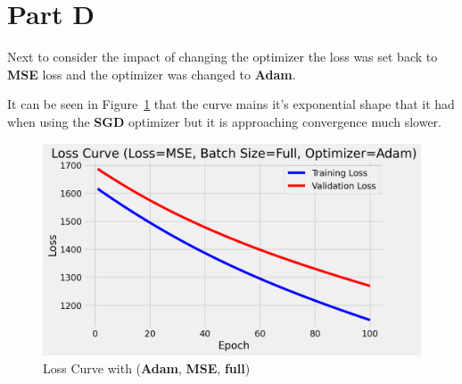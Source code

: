 \newpage
\section{Part D}
\label{sec:sec_d}
Next to consider the impact of changing the optimizer the loss was set back to \textbf{MSE} loss and the optimizer was changed to \textbf{Adam}. 


It can be seen in Figure~\ref{fig:d loss} that the curve mains it's exponential shape that it had when using the \textbf{SGD} optimizer but it is approaching convergence much slower.
\begin{figure}[htpb]
	\centering
	\includegraphics[width=\columnwidth]{figures/d_loss.png}
	\caption{Loss Curve with (\textbf{Adam}, \textbf{MSE}, \textbf{full})}
	\label{fig:d loss}
\end{figure}


